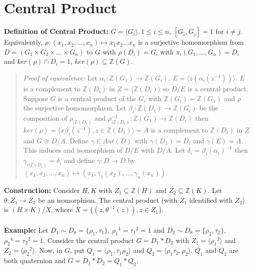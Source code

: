 \section {Central Product}
{\bf Definition of Central Product:}
$G= \langle G_i \rangle , 1 \le i \le n$, $[G_i , G_j ]=1$ for $i \ne j$.  Equivalently,
$\rho: (x_1, x_2, \ldots , x_n) \mapsto x_1 x_2 \ldots x_n$ is a surjective homomorphism
from $D= (G_1 \times G_2 \times \ldots \times G_n)$ to $G$ with $\rho(D_i) = G_i$ with
$\pi_i (G_1, \ldots , G_n)= D_i$ and $ker(\rho) \cap D_i = 1$, $ker(\rho) \subseteq {\mathbb Z}(G)$.
\begin{quote}
\emph{Proof of equivalence:}
Let $\alpha_i: {\mathbb Z}(G_1) \rightarrow {\mathbb Z}(G_i)$.
$E= \langle z(\alpha_i(z^{-1})) \rangle $.  $E$ is a complement to ${\mathbb Z}(D_i )$ in
$Z= \langle {\mathbb Z}(D_i) \rangle $ so $D/E$ is a central product.  Suppose $G$ is a
central product of the $G_i$ with ${\mathbb Z}(G_i)={\mathbb Z}(G_1)$ and $\rho$ the surjective
homomorphism.  Let $\beta_i:{\mathbb Z}(D_1) \rightarrow {\mathbb Z}(G_i)$ be the composition of
$\rho_{|{\mathbb Z}(D_1)}$ and
$\rho_{|{\mathbb Z}(D_i)}^{-1}: {\mathbb Z}(G_1) \rightarrow {\mathbb Z}(D_i)$ then
$ker(\rho)= \langle x \beta_i(z^{-1}), z \in {\mathbb Z}(D_1) \rangle = A$ is a complement
to ${\mathbb Z}(D_i)$ in $Z$ and $G \cong D/A$.  Define $\gamma \in Aut(D)$ with $\gamma(D_1)=D_i$
and $\gamma(E)=A$.  This induces and isomorphism of $D/E$ with $D/A$.  Let
$\delta_i= \beta_i (\alpha_i)^{-1}$ then $\gamma_{i|{\mathbb Z}(D_i)}= \delta_i$ and
define $\gamma: D \rightarrow D$ by $(x_1, x_2 , \ldots , x_n) \mapsto (x_1, \gamma_1(x_2), \ldots,
\gamma_n(x_n))$.
\end{quote}
{\bf Construction:} Consider $H,K$ with $Z_1 \subseteq {\mathbb Z}(H)$ and $Z_2 \subseteq {\mathbb Z}(K)$.  Let
$\theta: Z_1 \rightarrow Z_2$ be an isomorphism.  The central product (with $Z_1$ identified with $Z_2$) is $(H \times K) / X$,
where $X = \{(z, \theta^{-1}(z)), z \in Z_1 \}$.
\\
\\
{\bf Example:}
Let $D_1 \sim D_8= \{\rho_1, \tau_1 \}$, ${\rho_1}^4 = {\tau_1}^2 = 1$ and
$D_2 \sim D_8= \{\rho_2, \tau_2 \}$, ${\rho_2}^4 = {\tau_2}^2 = 1$.  Consider the
central product $G= D_1 * D_2$ with
$Z_1 = \langle {\rho_1}^2 \rangle$ and $Z_2 = \langle {\rho_2}^2 \rangle$. Now, in $G$,
put $Q_1 = \langle \rho_1, \tau_1 \rho_2 \rangle$ and
$Q_2 = \langle \rho_1 \tau_2, \rho_2 \rangle$.  $Q_1$ and $Q_2$ are both quaternion and
$G=D_1*D_2=Q_1*Q_2$.
\\
